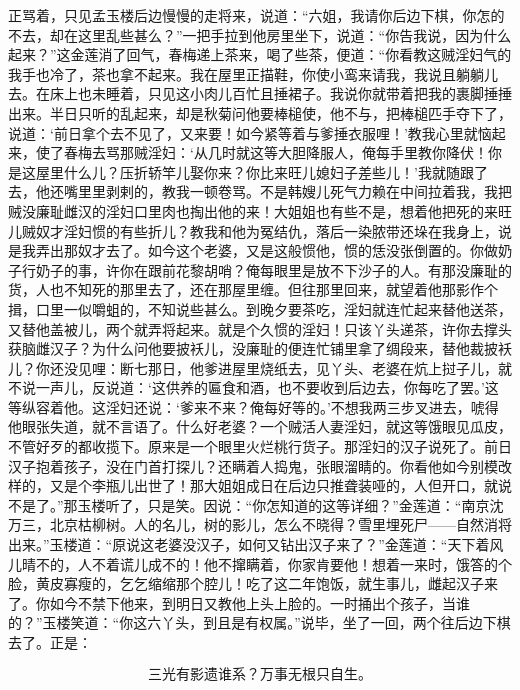 正骂着，只见孟玉楼后边慢慢的走将来，说道：“六姐，我请你后边下棋，你怎的不去，却在这里乱些甚么？”一把手拉到他房里坐下，说道：“你告我说，因为什么起来？”这金莲消了回气，春梅递上茶来，喝了些茶，便道：“你看教这贼淫妇气的我手也冷了，茶也拿不起来。我在屋里正描鞋，你使小鸾来请我，我说且躺躺儿去。\textShouWai 在床上也未睡着，只见这小肉儿百忙且捶裙子。我说你就带着把我的裹脚捶捶出来。半日只听的乱起来，却是秋菊问他要棒槌使，他不与，把棒槌匹手夺下了，说道：‘前日拿个去不见了，又来要！如今紧等着与爹捶衣服哩！’教我心里就恼起来，使了春梅去骂那贼淫妇：‘从几时就这等大胆降服人，俺每手里教你降伏！你是这屋里什么儿？压折轿竿儿娶你来？你比来旺儿媳妇子差些儿！’我就随跟了去，他还嘴里\textShiBi 里剥剌的，教我一顿卷骂。不是韩嫂儿死气力赖在中间拉着我，我把贼没廉耻雌汉的淫妇口里肉也掏出他的来！大姐姐也有些不是，想着他把死的来旺儿贼奴才淫妇惯的有些折儿？教我和他为冤结仇，落后一染脓带还垛在我身上，说是我弄出那奴才去了。如今这个老婆，又是这般惯他，惯的恁没张倒置的。你做奶子行奶子的事，许你在跟前花黎胡哨？俺每眼里是放不下沙子的人。有那没廉耻的货，人也不知死的那里去了，还在那屋里缠。但往那里回来，就望着他那影作个揖，口里一似嚼蛆的，不知说些甚么。到晚夕要茶吃，淫妇就连忙起来替他送茶，又替他盖被儿，两个就弄将起来。就是个久惯的淫妇！只该丫头递茶，许你去撑头获脑雌汉子？为什么问他要披袄儿，没廉耻的便连忙铺里拿了绸段来，替他裁披袄儿？你还没见哩：断七那日，他爹进屋里烧纸去，见丫头、老婆在炕上挝子儿，就不说一声儿，反说道：‘这供养的匾食和酒，也不要收到后边去，你每吃了罢。’这等纵容着他。这淫妇还说：‘爹来不来？俺每好等的。’不想我两三步叉进去，唬得他眼张失道，就不言语了。什么好老婆？一个贼活人妻淫妇，就这等饿眼见瓜皮，不管好歹的都收揽下。原来是一个眼里火烂桃行货子。那淫妇的汉子说死了。前日汉子抱着孩子，没在门首打探儿？还瞒着人捣鬼，张眼溜睛的。你看他如今别模改样的，又是个李瓶儿出世了！那大姐姐成日在后边只推聋装哑的，人但开口，就说不是了。”那玉楼听了，只是笑。因说：“你怎知道的这等详细？”金莲道：“南京沈万三，北京枯柳树。人的名儿，树的影儿，怎么不晓得？雪里埋死尸——自然消将出来。”玉楼道：“原说这老婆没汉子，如何又钻出汉子来了？”金莲道：“天下着风儿晴不的，人不着谎儿成不的！他不撺瞒着，你家肯要他！想着一来时，饿答的个脸，黄皮寡瘦的，乞乞缩缩那个腔儿！吃了这二年饱饭，就生事儿，雌起汉子来了。你如今不禁下他来，到明日又教他上头上脸的。一时捅出个孩子，当谁的？”玉楼笑道：“你这六丫头，到且是有权属。”说毕，坐了一回，两个往后边下棋去了。正是：

\[
三光有影遗谁系？万事无根只自生。
\]

